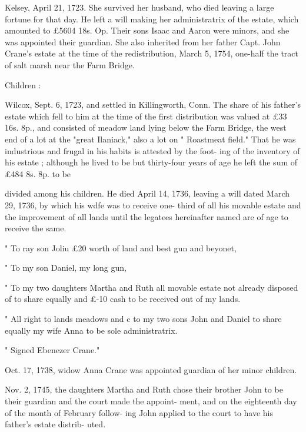 \documentclass[oneside]{book}
\begin{document}
Kelsey, April 21, 1723. She survived her husband, who died 
leaving a large fortune for that day. He left a will making her 
administratrix of the estate, which amounted to £5604  18s.  Op. 
Their sons Isaac and Aaron were minors, and she was appointed 
their guardian. She also inherited from her father Capt. John 
Crane's estate at the time of the redistribution, March 5, 1754, 
one-half the tract of salt marsh near the Farm Bridge. 

Children : 







Wilcox, Sept. 6, 1723, and settled in Killingworth, Conn. The 
share of his father's estate which fell to him at the time of the 
first distribution was valued at £33  16s.  8p., and consisted of 
meadow land lying below the Farm Bridge, the west end of a lot 
at the "great Ilaniack," also a lot on " Roastmeat field." That 
he was industrious and frugal in his habits is attested by the foot- 
ing of the inventory of his estate ; although he lived to be but 
thirty-four years of age he left the sum of £484  8s.  8p. to be 




divided among his children. He died April 14, 1736, leaving a 
will dated March 29, 1736, by which his wdfe was to receive one- 
third of all his movable estate and the improvement of all lands 
until the legatees hereinafter named are of age to receive the same. 

" To ray son Joliu £20 worth of land and best gun and beyonet, 

" To my son Daniel, my long gun, 

" To my two daughters Martha and Ruth all movable estate not already 
disposed of to share equally and £-10 cash to be received out of my lands. 

" All right to lands meadows and c to my two sons John and Daniel 
to share equally my wife Anna to be sole administratrix. 

" Signed Ebenezer Crane." 

Oct. 17, 1738, widow Anna Crane was appointed guardian of 
her minor children. 

Nov. 2, 1745, the daughters Martha and Ruth chose their 
brother John to be their guardian and the court made the appoint- 
ment, and on the eighteenth day of the month of February follow- 
ing John applied to the court to have his father's estate distrib- 
uted. 
\end{document}
